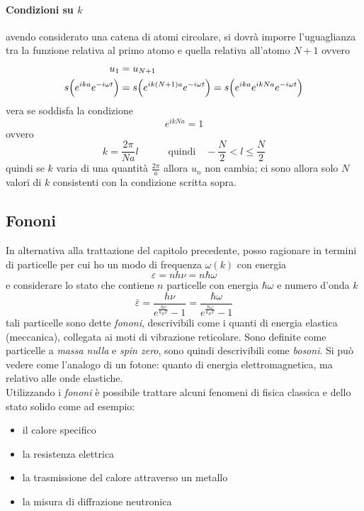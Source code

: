 \paragraph{Condizioni su $k$} avendo considerato una catena di atomi circolare, si dovrà imporre l'uguaglianza tra la funzione relativa al primo atomo e quella relativa all'atomo $N+1$ ovvero
\begin{equation}
\begin{split}
u_1 &= u_{N+1} \\
s \Bigl(  e^{ ika } e^{ -i \omega t }  \Bigr) & =  s \Bigl(  e^{ ik(N+1)a } e^{ -i \omega t }  \Bigr) = s \Bigl(  e^{ ika } e^{ ikNa } e^{ -i \omega t }  \Bigr)
\end{split}
\end{equation}
vera se soddisfa la condizione 
\begin{equation}
e^{ ikNa } = 1
\end{equation}
ovvero
\begin{equation}
k = \frac{2\pi}{N a} l \quad\quad\quad \mbox{quindi} \quad -\frac{N}{2} < l \le \frac{N}{2}
\end{equation}
quindi se $k$ varia di una quantità $\frac{2\pi}{a}$ allora $u_n$ non cambia;
ci sono allora solo $N$ valori di $k$ consistenti con la condizione scritta sopra.


\subsection{Fononi}
In alternativa alla trattazione del capitolo precedente, posso ragionare in termini di particelle per cui ho un modo di frequenza $\omega(k)$ con energia
\begin{equation}
\varepsilon = n h \nu = n \hbar \omega
\end{equation}
e considerare lo stato che contiene $n$ particelle con energia $\hbar \omega$ e numero d'onda $k$
\begin{equation}
\bar \varepsilon = \frac{h \nu}{e^{ \frac{h\nu}{k_B T} } - 1}  
= \frac{\hbar \omega}{e^{ \frac{\hbar\omega}{k_B T} } - 1}  
\end{equation}
tali particelle sono dette \textit{fononi}, descrivibili come i quanti di energia elastica (meccanica), collegata ai moti di vibrazione reticolare.
Sono definite come particelle a \textit{massa nulla} e \textit{spin zero}, sono quindi descrivibili come \textit{bosoni}.
Si può vedere come l'analogo di un fotone: quanto di energia elettromagnetica, ma relativo alle onde elastiche. \\
Utilizzando i \textit{fononi} è possibile trattare alcuni fenomeni di fisica classica e dello stato solido come ad esempio:
\begin{itemize}
\item il calore specifico
\item la resistenza elettrica
\item la trasmissione del calore attraverso un metallo
\item la misura di diffrazione neutronica
\end{itemize}




